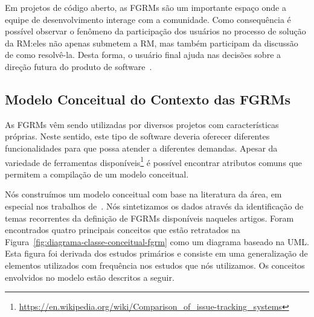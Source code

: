 Em projetos de código aberto, as FGRMs são um importante espaço onde a equipe de
desenvolvimento interage com a comunidade. Como consequência é possível observar
o fenômeno da participação dos usuários no processo de solução da RM:\@ eles não
apenas submetem a RM, mas também participam da discussão de como resolvê-la.
Desta forma, o usuário final ajuda nas decisões sobre a direção futura do
produto de software~\cite{breu2010information}.

\subsection{Modelo Conceitual do Contexto das FGRMs}
\label{sub:espectro_funcionalidades_fgrm}

As FGRMs vêm sendo utilizadas por diversos projetos com características
próprias. Neste sentido, este tipo de software deveria oferecer diferentes
funcionalidades para que possa atender a diferentes demandas. Apesar da
variedade de ferramentas
disponíveis\footnote{\url{https://en.wikipedia.org/wiki/Comparison_of_issue-tracking_systems}}
é possível encontrar atributos comuns que permitem a compilação de um modelo
conceitual.

Nós construímos um modelo conceitual com base na literatura da área, em especial
nos trabalhos de~\cite{cavalcanti2014challenges, singh2011bug,
    kshirsagar2015issue}. Nós sintetizamos os dados através da identificação de
temas recorrentes da definição de FGRMs disponíveis naqueles artigos. Foram
encontrados quatro principais conceitos que estão retratados na
Figura~\ref{fig:diagrama-classe-conceitual-fgrm} como um diagrama baseado na
UML\@. Esta figura foi derivada dos estudos primários e consiste em uma
generalização de elementos utilizados com frequência nos estudos que nós
utilizamos. Os conceitos envolvidos no modelo estão descritos a seguir.

